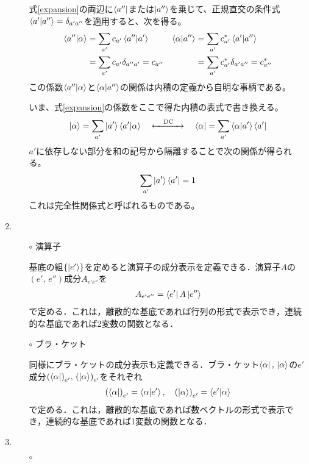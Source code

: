 \documentclass{jarticle}
\begin{document}
\begin{enumerate}
\begin{itemize}
    式\eqref{expansion}の両辺に$\bra{a''}$または$\ket{a''}$を乗じて、正規直交の条件式$\bra{a'}\ket{a''} = \delta_{a'a''}$を適用すると、次を得る。
    \begin{align}
      \bra{a''}\ket{\alpha} & = \sum_{a'}c_{a'} \bra{a''}\ket{a'} & \bra{\alpha}\ket{a''} & = \sum_{a'}c_{a'}^* \bra{a'} \ket{a''} \\
                            & = \sum_{a'}c_{a'} \delta_{a''a'} = c_{a''}    &                       & = \sum_{a'}c_{a'}^* \delta_{a'a''} = c_{a''}^*
    \end{align}    
    この係数$\bra{a''}\ket{\alpha}$と$\bra{\alpha}\ket{a''}$の関係は内積の定義から自明な事柄である。

    いま、式\eqref{expansion}の係数をここで得た内積の表式で書き換える。
    \begin{align}
      \ket{\alpha} = \sum_{a'} \ket{a'} \bra{a'}\ket{\alpha} \quad \xleftrightarrow{\quad\mathrm{DC}\quad} \quad 
      \bra{\alpha} = \sum_{a'} \bra{\alpha}\ket{a'}\bra{a'}
    \end{align}
    $a'$に依存しない部分を和の記号から隔離することで次の関係が得られる。
    \begin{align}
      \sum_{a'} \ket{a'}\bra{a'} = 1
    \end{align}
    これは完全性関係式と呼ばれるものである。
  \end{itemize}

\item {}
  \begin{itemize}
  \item [$\circ$] 演算子

    基底の組$\qty{\ket{e'}}$を定めると演算子の成分表示を定義できる．演算子$A$の$(e', \, e'')$成分$A_{e'e''}$を
    \begin{align}
      A_{e'e''} = \bra{e'}A\ket{e''}
    \end{align}
    で定める．これは，離散的な基底であれば行列の形式で表示でき，連続的な基底であれば2変数の関数となる．

  \item [$\circ$] ブラ・ケット

    同様にブラ・ケットの成分表示も定義できる．ブラ・ケット$\bra{\alpha}, \, \ket{\alpha}$の$e'$成分$\qty(\bra{\alpha})_{e'}, \, \qty(\ket{\alpha})_{e'}$をそれぞれ
    \begin{align}
      \qty(\bra{\alpha})_{e'} = \bra{\alpha}\ket{e'}, \quad
      \qty(\ket{\alpha})_{e'} = \bra{e'}\ket{\alpha}
    \end{align}
    で定める．これは，離散的な基底であれば数ベクトルの形式で表示でき，連続的な基底であれば1変数の関数となる．
  \end{itemize}

\item {}

  \begin{itemize}
  \item [$\circ$] 
  \end{itemize}
\end{enumerate}
\end{document}

